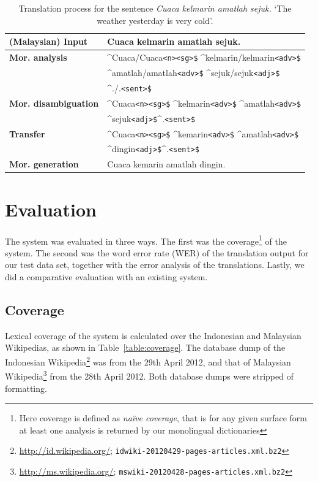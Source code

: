 \documentclass[10pt,a5paper,twoside]{article}
\newcommand{\tag}[1]{{\small{\texttt{#1}}}}
\begin{document}
\begin{table}[htbp]
\centering
\begin{tabular}{ll}
\toprule
{\bf (Malaysian) Input} & Cuaca kelmarin amatlah sejuk. \\ 
\midrule
{\bf Mor. analysis} & \^{}Cuaca/Cuaca\tag{<n>}\tag{<sg>\$} \^{}kelmarin/kelmarin\tag{<adv>\$}\\
~ & \^{}amatlah/amatlah\tag{<adv>\$} \^{}sejuk/sejuk\tag{<adj>\$}\\
~ & \^{}./.\tag{<sent>\$}\\
\midrule
{\bf Mor. disambiguation}& \^{}Cuaca\tag{<n>}\tag{<sg>\$} \^{}kelmarin\tag{<adv>\$} \^{}amatlah\tag{<adv>\$}\\
~ & \^{}sejuk\tag{<adj>\$}\^{}.\tag{<sent>\$} \\
\midrule
{\bf Transfer}& \^{}Cuaca\tag{<n>}\tag{<sg>\$} \^{}kemarin\tag{<adv>\$} \^{}amatlah\tag{<adv>\$}\\
~ & \^{}dingin\tag{<adj>\$}\^{}.\tag{<sent>\$} \\ 
\midrule
{\bf Mor. generation} & Cuaca kemarin amatlah dingin. \\
\bottomrule
\end{tabular}
 \caption{Translation process for the sentence \emph{Cuaca kelmarin amatlah sejuk.} `The weather yesterday is very cold'.}
\end{table}

\section{Evaluation}
\label{sec:eval}
The system was evaluated in three ways. The first was the coverage\footnote{Here coverage is defined as \emph{na\"ive coverage}, that is for any given surface form at least one analysis is returned by our monolingual dictionaries} of the system. The second was the word error rate (WER) of the translation output for our test data set, together with the error analysis of the translations. Lastly, we did a comparative evaluation with an existing system.

\subsection{Coverage}
Lexical coverage of the system is calculated over the Indonesian and Malaysian Wikipedias, as shown in Table~\ref{table:coverage}. The database dump of the Indonesian Wikipedia\footnote{\url{http://id.wikipedia.org/}; \texttt{idwiki-20120429-pages-articles.xml.bz2}} was from the 29th April 2012, and that of Malaysian Wikipedia\footnote{\url{http://ms.wikipedia.org/}; \texttt{mswiki-20120428-pages-articles.xml.bz2}} from the 28th April 2012. Both database dumps were stripped of formatting.
\end{document}
